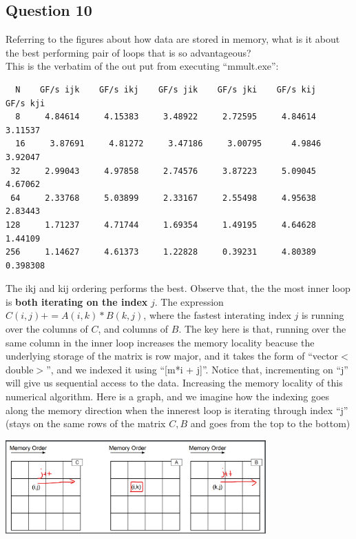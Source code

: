 \documentclass[]{article}
\begin{document}
\subsection*{Question 10}
    Referring to the figures about how data are stored in memory, what is it about the best performing pair of loops that is so advantageous?
    \\[1.1em]
    This is the verbatim of the out put from executing ``mmult.exe'': 
    \begin{lstlisting}
  N    GF/s ijk    GF/s ikj    GF/s jik    GF/s jki    GF/s kij    GF/s kji
  8     4.84614     4.15383     3.48922     2.72595     4.84614     3.11537
  16     3.87691     4.81272     3.47186     3.00795      4.9846     3.92047
 32     2.99043     4.97858     2.74576     3.87223     5.09045     4.67062
 64     2.33768     5.03899     2.33167     2.55498     4.95638     2.83443
128     1.71237     4.71744     1.69354     1.49195     4.64628     1.44109
256     1.14627     4.61373     1.22828     0.39231     4.80389    0.398308
    \end{lstlisting}
    The ikj and kij ordering performs the best. Observe that, the the most inner loop is \textbf{both iterating on the index} $j$. The expression $C(i, j) += A(i, k) * B(k, j)$, where the fastest interating index $j$ is running over the columns of $C$, and columns of $B$. The key here is that, running over the same column in the inner loop increases the memory locality beacuse the underlying storage of the matrix is row major, and it takes the form of ``vector$<$double$>$'', and we indexed it using ``[m*i + j]''. Notice that, incrementing on ``j'' will give us sequential access to the data. Increasing the memory locality of this numerical algorithm. Here is a graph, and we imagine how the indexing goes along the memory direction when the innerest loop is iterating through index ``j'' (stays on the same rows of the matrix $C, B$ and goes from the top to the bottom)
    \begin{center}
        \includegraphics[width=10cm]{bestloop-ordering.png}
    \end{center}
\end{document}
